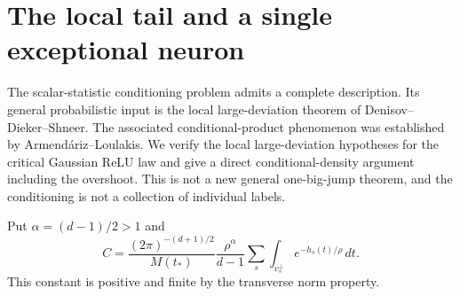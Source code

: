 \section{The local tail and a single exceptional neuron}
The scalar-statistic conditioning problem admits a complete description.
Its general probabilistic input is the local large-deviation theorem of
Denisov--Dieker--Shneer. The associated conditional-product phenomenon
was established by Armend\'ariz--Loulakis. We verify the local
large-deviation hypotheses for the critical Gaussian ReLU law and give
a direct conditional-density argument including the overshoot.
This is not a new general
one-big-jump theorem, and the conditioning is not a collection of
individual labels.

Put $\alpha=(d-1)/2>1$ and
\[
 C=\frac{(2\pi)^{-(d+1)/2}}{M(t_*)}
 \frac{\rho^\alpha}{d-1}
 \sum_s\int_{v_s^\perp}e^{-h_s(t)/\rho}\,dt.
 \tag{10}
\]
This constant is positive and finite by the transverse norm property.

